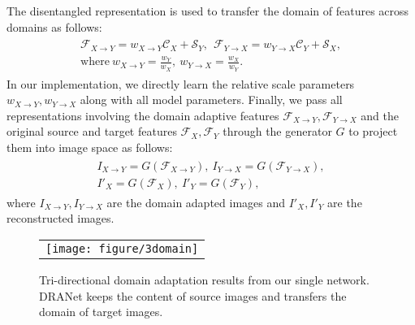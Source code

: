 \documentclass[final]{cvpr}
\begin{document}
The disentangled representation is used to transfer the domain of features across domains as follows:
\begin{gather}
\begin{split}
\label{eq:feature}
\mathcal{F}_{X \to Y} = w_{X \to Y} \mathcal{C}_X + \mathcal{S}_Y, ~~
\mathcal{F}_{Y \to X} = w_{Y \to X} \mathcal{C}_Y + \mathcal{S}_X, \\
\text{where}~w_{X \to Y} = \frac{w_Y}{w_X},~w_{Y \to X} = \frac{w_X}{w_Y}.
\end{split}
\end{gather}
In our implementation, we directly learn the relative scale parameters $w_{X \to Y}, w_{Y \to X}$ along with all model parameters.
Finally, we pass all representations involving the domain adaptive features $\mathcal{F}_{X\to Y}, \mathcal{F}_{Y\to X}$ and the original source and target features $\mathcal{F}_X,\mathcal{F}_Y$ through the generator $G$ to project them into image space as follows:
\begin{gather}
\begin{split}
I_{X\to Y} = G(\mathcal{F}_{X\to Y}),~I_{Y\to X} = G(\mathcal{F}_{Y\to X}),\\
I'_X = G(\mathcal{F}_X),~I'_Y = G(\mathcal{F}_Y),
\end{split}
\end{gather}
where $I_{X\to Y}, I_{Y\to X}$ are the domain adapted images and $I'_X, I'_Y$ are the reconstructed images.

\begin{figure}[t] 
	\centering
	\begin{tabular}{c@{\hspace{1mm}}}
    \texttt{[image: figure/3domain]}
\end{tabular}
	\caption{Tri-directional domain adaptation results from our single network. DRANet keeps the content of source images and transfers the domain of target images.}
	\label{fig:3domain}
	\vspace{-3mm}
\end{figure}
\end{document}
